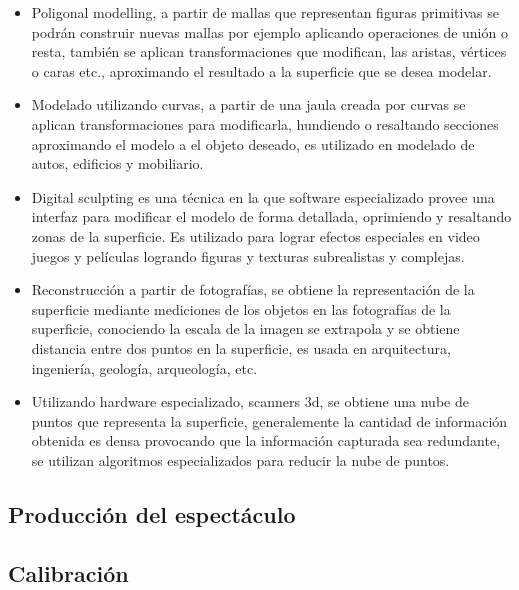 \begin{itemize}
  \item Poligonal modelling, a partir de mallas que representan figuras primitivas se podrán construir nuevas mallas por ejemplo aplicando operaciones de unión o resta, también se aplican transformaciones que modifican, las aristas, vértices o caras etc., aproximando el resultado a la superficie que se desea modelar.
  \item  Modelado utilizando curvas, a partir de una jaula creada por curvas se aplican transformaciones para modificarla, hundiendo o resaltando secciones aproximando el modelo a el objeto deseado, es utilizado en modelado de autos, edificios y mobiliario.
  \item Digital sculpting  es una técnica en la que software especializado provee una interfaz para modificar el modelo de forma detallada, oprimiendo y resaltando zonas de la superficie. Es utilizado para lograr efectos especiales en video juegos y películas logrando figuras y texturas subrealistas y complejas.
  \item Reconstrucción a partir de fotografías, se obtiene la representación de la superficie mediante mediciones de los objetos en las fotografías de la superficie, conociendo la escala de la imagen se extrapola y se obtiene distancia entre dos puntos en la superficie, es usada en arquitectura, ingeniería, geología, arqueología, etc.
  \item Utilizando hardware especializado, scanners 3d, se obtiene una nube de puntos que representa la superficie, generalemente la cantidad de información obtenida es densa provocando que la información capturada sea redundante, se utilizan algoritmos especializados para reducir la nube de puntos.
\end{itemize}
\subsection{Producción del espectáculo}

\subsection{Calibración}